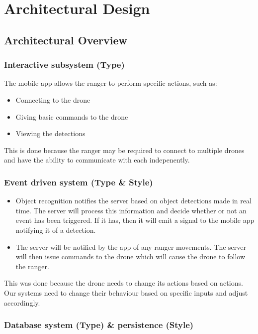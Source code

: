 \chapter{Architectural Design}


\section{Architectural Overview}

\subsection{Interactive subsystem (Type)}

The mobile app allows the ranger to perform specific actions, such as:
\begin{itemize}
	\item Connecting to the drone
	\item Giving basic commands to the drone
	\item Viewing the detections
\end{itemize}
This is done because the ranger may be required to connect to multiple drones and have the ability to communicate with each indepenently.

\subsection{Event driven system (Type \& Style)}

\begin{itemize}
	\item Object recognition notifies the server based on object detections made in real time. 
	The server will process this information and decide whether or not an event has been triggered. 
	If it has, then it will emit a signal to the mobile app notifying it of a detection.

	\item The server will be notified by the app of any ranger movements. The server will then issue 
	commands to the drone which will cause the drone to follow the ranger.
\end{itemize}
This was done because the drone needs to change its actions based on actions. Our systems need to change their behaviour
based on specific inputs and adjust accordingly.

\subsection{Database system (Type) \& persistence (Style)}

